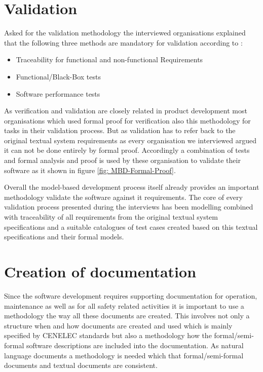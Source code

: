 \documentclass{./template/openetcs_report}
\begin{document}
\section{Validation}

Asked for the validation methodology the interviewed organisations explained that the following three methods are mandatory for validation according to \citeauthor{EN50128:2011}:

\vspace{-10pt}
\begin{itemize}[topsep=2pt, partopsep=2pt,itemsep=2pt,parsep=2pt]
\item Traceability for functional and non-functional Requirements
\item Functional/Black-Box tests
\item Software performance tests
\end{itemize}

As verification and validation are closely related in product development most organisations which used formal proof for verification also this methodology for tasks in their validation process. But as validation has to refer back to the original textual system requirements as every organisation we interviewed argued it can not be done entirely by formal proof. Accordingly a combination of tests and formal analysis and proof is used by these organisation to validate their software as it shown in figure \ref{fig: MBD-Formal-Proof}. 

Overall the model-based development process itself already provides an important methodology validate the software against it requirements. The core of every validation process presented during the interviews has been modelling combined with traceability of all requirements from the original textual system specifications and a suitable catalogues of test cases created based on this textual specifications and their formal models.

\section{Creation of documentation}

Since the software development requires supporting documentation for operation, maintenance as well as for all safety related activities it is important to use a methodology the way all these documents are created. This involves not only a structure when and how documents are created and used which is mainly specified by CENELEC standards but also a methodology how the formal/semi-formal software descriptions are included into the documentation. As natural language documents a methodology is needed which that formal/semi-formal documents and textual documents are consistent.
\end{document}
